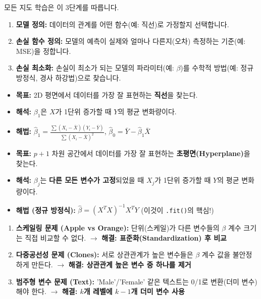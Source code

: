 \documentclass[11pt,a4paper]{book}
\theoremstyle{definition}
\begin{document}
\begin{tcolorbox}[title={기계 학습 3단계 프로세스}]
모든 지도 학습은 이 3단계를 따릅니다.
\begin{enumerate}
    \item \textbf{모델 정의:} 데이터의 관계를 어떤 함수(예: 직선)로 가정할지 선택합니다.
    \item \textbf{손실 함수 정의:} 모델의 예측이 실제와 얼마나 다른지(오차) 측정하는 기준(예: MSE)을 정합니다.
    \item \textbf{손실 최소화:} 손실이 최소가 되는 모델의 파라미터(예: $\beta$)를 수학적 방법(예: 정규 방정식, 경사 하강법)으로 찾습니다.
\end{enumerate}
\end{tcolorbox}

\begin{tcolorbox}[title={단순 선형 회귀 (SLR): $Y = \beta_0 + \beta_1 X$}]
\begin{itemize}
    \item \textbf{목표:} 2D 평면에서 데이터를 가장 잘 표현하는 \textbf{직선}을 찾는다.
    \item \textbf{해석:} $\beta_1$은 $X$가 1단위 증가할 때 $Y$의 평균 변화량이다.
    \item \textbf{해법:} $\hat{\beta}_1 = \frac{\sum (X_i - \bar{X})(Y_i - \bar{Y})}{\sum (X_i - \bar{X})^2}$, $\hat{\beta}_0 = \bar{Y} - \hat{\beta}_1 \bar{X}$
\end{itemize}
\end{tcolorbox}

\begin{tcolorbox}[title={다중 선형 회귀 (MLR): $Y = X\beta$}]
\begin{itemize}
    \item \textbf{목표:} $p+1$ 차원 공간에서 데이터를 가장 잘 표현하는 \textbf{초평면(Hyperplane)}을 찾는다.
    \item \textbf{해석:} $\beta_j$는 \textbf{다른 모든 변수가 고정}되었을 때 $X_j$가 1단위 증가할 때 $Y$의 평균 변화량이다.
    \item \textbf{해법 (정규 방정식):} $\hat{\beta} = (X^T X)^{-1} X^T Y$ (이것이 \texttt{.fit()}의 핵심!)
\end{itemize}
\end{tcolorbox}

\begin{tcolorbox}[title={모델 해석의 3대 함정}]
\begin{enumerate}
    \item \textbf{스케일링 문제 (Apple vs Orange):}
    단위(스케일)가 다른 변수들의 $\beta$ 계수 크기는 직접 비교할 수 없다. $\rightarrow$ \textbf{해결: 표준화(Standardization) 후 비교}
    
    \item \textbf{다중공선성 문제 (Clones):}
    서로 상관관계가 높은 변수들은 $\beta$ 계수 값을 불안정하게 만든다. $\rightarrow$ \textbf{해결: 상관관계 높은 변수 중 하나를 제거}
    
    \item \textbf{범주형 변수 문제 (Text):}
    'Male'/'Female' 같은 텍스트는 0/1로 변환(더미 변수)해야 한다. $\rightarrow$ \textbf{해결: $k$개 레벨에 $k-1$개 더미 변수 사용}
\end{enumerate}
\end{tcolorbox}
\end{document}
